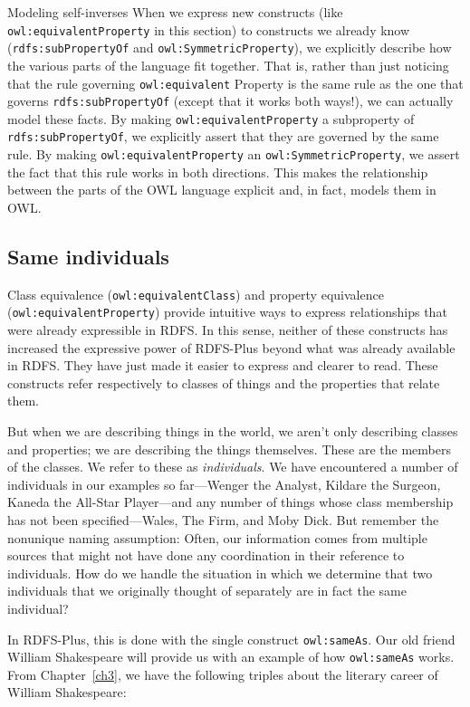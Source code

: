 \begin{challenge}{Modeling self-inverses}
When we express new constructs (like \texttt{owl:equivalentProperty} in this
section) to constructs we already know (\texttt{rdfs:subPropertyOf} and
\texttt{owl:SymmetricProperty}), we explicitly describe how the various parts of
the language fit together. That is, rather than just noticing that the
rule governing \texttt{owl:equivalent} Property is the same rule as the one that
governs \texttt{rdfs:subPropertyOf} (except that it works both ways!), we can
actually model these facts. By making \texttt{owl:equivalentProperty} a
subproperty of \texttt{rdfs:subPropertyOf}, we explicitly assert that they are
governed by the same rule. By making \texttt{owl:equivalentProperty} an
\texttt{owl:SymmetricProperty}, we assert the fact that this rule
works in both directions. This makes the relationship between the parts
of the OWL language explicit and, in fact, models them in OWL.

\subsection{Same individuals}

Class equivalence (\texttt{owl:equivalentClass}) and property
equivalence (\texttt{owl:equivalentProperty}) provide intuitive ways to express
relationships that were already expressible in RDFS. In this sense,
neither of these constructs has increased the expressive power of
RDFS-Plus beyond what was already available in RDFS. They have just made
it easier to express and clearer to read. These constructs refer
respectively to classes of things and the properties that relate them.

But when we are describing things in the world, we aren't only
describing classes and properties; we are describing the things
themselves. These are the members of the classes. We refer to these as
\emph{individuals}. We have encountered a number of individuals in our examples
so far---Wenger the Analyst, Kildare the Surgeon, Kaneda the All-Star
Player---and any number of things whose class membership has not been
specified---Wales, The Firm, and Moby Dick. But remember the nonunique
naming assumption: Often, our information comes from multiple sources
that might not have done any coordination in their reference to
individuals. How do we handle the situation in which we determine that
two individuals that we originally thought of separately are in fact the
same individual?

In RDFS-Plus, this is done with the single construct \texttt{owl:sameAs}. Our old
friend William Shakespeare will provide us with an example of how
\texttt{owl:sameAs} works. From Chapter~\ref{ch3}, we have the following triples about
the literary career of William Shakespeare:


\end{challenge}
